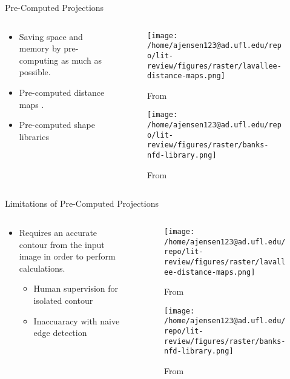\documentclass[presentation, aspectratio=1610]{beamer}
\begin{document}
\begin{frame}[label={sec:org93f2248}]{Pre-Computed Projections}
\begin{columns}
\begin{column}{0.5\columnwidth}
\begin{itemize}
\item Saving space and memory by pre-computing as much as possible.
\item Pre-computed distance maps \autocites{zuffiModelbasedMethodReconstruction1999}[][]{lavalleeRecoveringPositionOrientation1995}.
\item Pre-computed shape libraries \autocite{banksAccurateMeasurementThreedimensional1996}
\end{itemize}
\end{column}
\begin{column}{0.6\columnwidth}
\begin{figure}[htbp]
\centering
\texttt{[image: /home/ajensen123@ad.ufl.edu/repo/lit-review/figures/raster/lavallee-distance-maps.png]}
\caption{From \autocite{lavalleeRecoveringPositionOrientation1995}}
\end{figure}
\begin{figure}[htbp]
\centering
\texttt{[image: /home/ajensen123@ad.ufl.edu/repo/lit-review/figures/raster/banks-nfd-library.png]}
\caption{From \autocite{banksAccurateMeasurementThreedimensional1996}}
\end{figure}
\end{column}
\end{columns}
\end{frame}
\begin{frame}[label={sec:orgbba6e05}]{Limitations of Pre-Computed Projections}
\begin{columns}
\begin{column}{0.5\columnwidth}
\begin{itemize}
\item Requires an accurate contour from the input image in order to perform calculations.
\begin{itemize}
\item Human supervision for isolated contour
\item Inaccuaracy with naive edge detection
\end{itemize}
\end{itemize}
\end{column}
\begin{column}{0.6\columnwidth}
\begin{figure}[htbp]
\centering
\texttt{[image: /home/ajensen123@ad.ufl.edu/repo/lit-review/figures/raster/lavallee-distance-maps.png]}
\caption{From \autocite{lavalleeRecoveringPositionOrientation1995}}
\end{figure}
\begin{figure}[htbp]
\centering
\texttt{[image: /home/ajensen123@ad.ufl.edu/repo/lit-review/figures/raster/banks-nfd-library.png]}
\caption{From \autocite{banksAccurateMeasurementThreedimensional1996}}
\end{figure}
\end{column}
\end{columns}
\end{frame}
\end{document}
